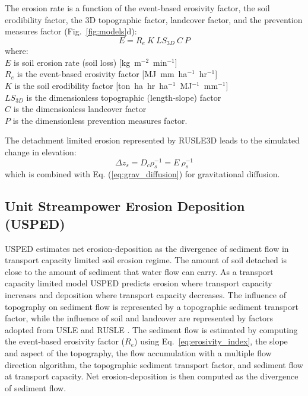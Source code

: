 \documentclass[gmd, manuscript]{copernicus}
\begin{document}
The erosion rate is a function of the event-based erosivity factor, 
the soil erodibility factor, the 3D topographic factor,
landcover factor, and the prevention measures factor 
(Fig.~\ref{fig:models}d):
%
\begin{equation}
\label{eq:rusle}
{E = R_e ~ K ~ LS_{3D} ~ C ~ P}
\end{equation}
%
{\small
\noindent
where: \\
\noindent
\hspace*{0.5em} $E$ is soil erosion rate (soil loss) [\unit{kg~m}$^{-2}$~\unit{min}$^{-1}$]\\
\hspace*{0.5em} $R_e$ is the event-based erosivity factor [\unit{MJ~mm~ha}$^{-1}$~\unit{hr}$^{-1}$]\\
\hspace*{0.5em} $K$ is the soil erodibility factor [\unit{ton~ha~hr~ha}$^{-1}$~\unit{MJ}$^{-1}$~\unit{mm}$^{-1}$]\\
\hspace*{0.5em} $LS_{3D}$ is the dimensionless topographic (length-slope) factor\\
\hspace*{0.5em} $C$ is the dimensionless landcover factor\\
\hspace*{0.5em} $P$ is the dimensionless prevention measures factor.\\
}

\noindent
The detachment limited erosion represented by RUSLE3D leads to the simulated change in elevation: 
\begin{equation}
\label{eq:dz_rusle}
{\Delta z_s = D_c \rho_s^{-1} = E ~ \rho_s^{-1}}
\end{equation}
which is combined with Eq. (\ref{eq:grav_diffusion})
for gravitational diffusion.


\subsection{Unit Streampower Erosion Deposition (USPED)} \label{usped_model}
USPED estimates net erosion-deposition as the divergence of sediment flow
in transport capacity limited soil erosion regime.
The amount of soil detached is 
close to the amount of sediment that water flow can carry.
As a transport capacity limited model
USPED predicts erosion where transport capacity increases
and deposition where transport capacity decreases. 
The influence of topography on sediment flow  
is represented by a topographic sediment transport factor,
while the influence of soil and landcover are represented by 
factors adopted from USLE and RUSLE
\citep{Mitasova1996}.
%
The sediment flow is estimated by computing
the event-based erosivity factor ($R_e$) 
using Eq.~\ref{eq:erosivity_index},
the slope and aspect of the topography,
the flow accumulation with a multiple flow direction algorithm,
the topographic sediment transport factor,
and sediment flow at transport capacity.
Net erosion-deposition is then computed as the divergence of sediment flow. 
\end{document}
